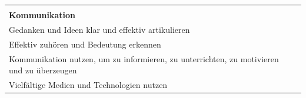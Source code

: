 \documentclass[
  ngerman,
  paper=a4,
,captions=tableheading
]{scrartcl}
\begin{document}
\begin{longtable}[]{@{}lll@{}}
\begin{minipage}[t]{0.72\columnwidth}
\end{minipage} & \begin{minipage}[t]{0.10\columnwidth}\raggedright
\strut
\end{minipage} & \begin{minipage}[t]{0.10\columnwidth}\raggedright
\strut
\end{minipage}\tabularnewline
\begin{minipage}[t]{0.72\columnwidth}\raggedright
\textbf{Kommunikation}\strut
\end{minipage} & \begin{minipage}[t]{0.10\columnwidth}\raggedright
\strut
\end{minipage} & \begin{minipage}[t]{0.10\columnwidth}\raggedright
\strut
\end{minipage}\tabularnewline
\begin{minipage}[t]{0.72\columnwidth}\raggedright
Gedanken und Ideen klar und effektiv artikulieren\strut
\end{minipage} & \begin{minipage}[t]{0.10\columnwidth}\raggedright
\strut
\end{minipage} & \begin{minipage}[t]{0.10\columnwidth}\raggedright
\strut
\end{minipage}\tabularnewline
\begin{minipage}[t]{0.72\columnwidth}\raggedright
Effektiv zuhören und Bedeutung erkennen\strut
\end{minipage} & \begin{minipage}[t]{0.10\columnwidth}\raggedright
\strut
\end{minipage} & \begin{minipage}[t]{0.10\columnwidth}\raggedright
\strut
\end{minipage}\tabularnewline
\begin{minipage}[t]{0.72\columnwidth}\raggedright
Kommunikation nutzen, um zu informieren, zu unterrichten, zu motivieren
und zu überzeugen\strut
\end{minipage} & \begin{minipage}[t]{0.10\columnwidth}\raggedright
\strut
\end{minipage} & \begin{minipage}[t]{0.10\columnwidth}\raggedright
\strut
\end{minipage}\tabularnewline
\begin{minipage}[t]{0.72\columnwidth}\raggedright
Vielfältige Medien und Technologien nutzen\strut

\end{minipage}
\end{longtable}
\end{document}
